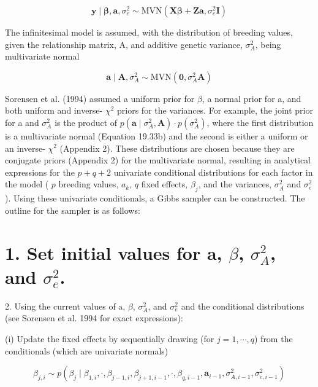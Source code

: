 \documentclass{article}
\begin{document}
\begin{equation}
\mathbf{y}\mid\boldsymbol{\beta},\mathbf{a},\sigma_{e}^{2}\sim\mathrm{MVN}(\mathbf{X}\boldsymbol{\beta}+\mathbf{Z}\mathbf{a},\sigma_{e}^{2}\mathbf{I})
\tag{19.33a}
\label{eq:19_33a}
\end{equation}

The infinitesimal model is assumed, with the distribution of breeding values, given the relationship matrix, A, and additive genetic variance,  $ \sigma_{A}^{2} $, being multivariate normal

\begin{equation}
\mathbf{a}\mid\mathbf{A},\sigma_{A}^{2}\sim\mathrm{MVN}(\mathbf{0},\sigma_{A}^{2}\mathbf{A})
\tag{19.33b}
\label{eq:19_33b}
\end{equation}

Sorensen et al. (1994) assumed a uniform prior for  $ \beta $, a normal prior for a, and both uniform and inverse- $ \chi^2 $ priors for the variances. For example, the joint prior for a and  $ \sigma_A^2 $ is the product of  $ p(\mathbf{a} \mid \sigma_A^2, \mathbf{A}) \cdot p(\sigma_A^2) $, where the first distribution is a multivariate normal (Equation 19.33b) and the second is either a uniform or an inverse- $ \chi^2 $ (Appendix 2). These distributions are chosen because they are conjugate priors (Appendix 2) for the multivariate normal, resulting in analytical expressions for the  $ p + q + 2 $ univariate conditional distributions for each factor in the model ( $ p $ breeding values,  $ a_k $,  $ q $ fixed effects,  $ \beta_j $, and the variances,  $ \sigma_A^2 $ and  $ \sigma_e^2 $). Using these univariate conditionals, a Gibbs sampler can be constructed. The outline for the sampler is as follows:

\section{1. Set initial values for a,  $ \beta $,  $ \sigma_{A}^{2} $, and  $ \sigma_{e}^{2} $.}
2. Using the current values of a,  $ \beta $,  $ \sigma_{A}^{2} $, and  $ \sigma_{e}^{2} $ and the conditional distributions (see Sorensen et al. 1994 for exact expressions):

(i) Update the fixed effects by sequentially drawing (for  $ j = 1, \cdots, q $) from the conditionals (which are univariate normals)

\begin{equation}
\beta_{j,i}\sim p(\beta_{j}\mid\beta_{1,i},\cdot,\beta_{j-1,i},\beta_{j+1,i-1},\cdot,\beta_{q,i-1},\mathbf{a}_{i-1},\sigma_{A,i-1}^{2},\sigma_{e,i-1}^{2})
\end{equation}
\end{document}
